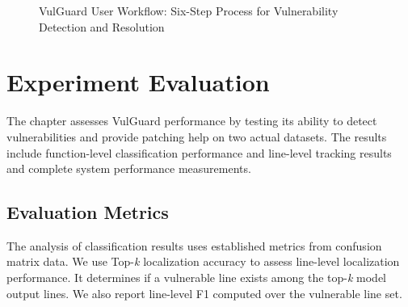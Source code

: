 \begin{figure}[htbp]
\centering
{}
\caption{VulGuard User Workflow: Six-Step Process for Vulnerability Detection and Resolution}
\label{fig:workflow}
\end{figure}

\chapter{Experiment Evaluation}
\label{ch:experiment-evaluation}

The chapter assesses VulGuard performance by testing its ability to detect vulnerabilities and provide patching help on two actual datasets. The results include function-level classification performance and line-level tracking results and complete system performance measurements.

\section{Evaluation Metrics}
The analysis of classification results uses established metrics from confusion matrix data. We use Top-\textit{k} localization accuracy to assess line-level localization performance. It determines if a vulnerable line exists among the top-\textit{k} model output lines. We also report line-level F1 computed over the vulnerable line set.

